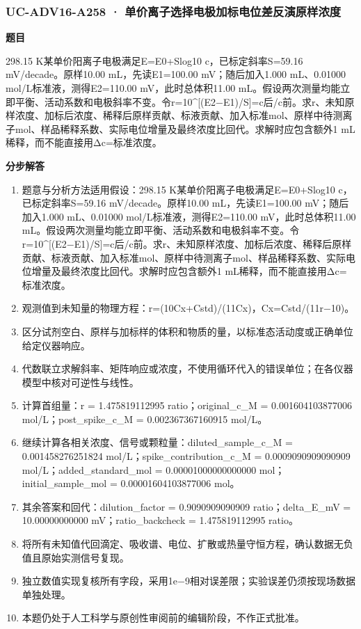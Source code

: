 \documentclass[UTF8,11pt,a4paper]{ctexart}
\begin{document}
\subsubsection*{UC-ADV16-A258 · 单价离子选择电极加标电位差反演原样浓度}
\noindent\textbf{题目}\par
298.15 K某单价阳离子电极满足E=E0+Slog10 c，已标定斜率S=59.16 mV/decade。原样10.00 mL，先读E1=100.00 mV；随后加入1.000 mL、0.01000 mol/L标准液，测得E2=110.00 mV，此时总体积11.00 mL。假设两次测量均能立即平衡、活动系数和电极斜率不变。令r=10\textasciicircum{}[(E2−E1)/S]=c后/c前。求r、未知原样浓度、加标后浓度、稀释后原样贡献、标液贡献、加入标准mol、原样中待测离子mol、样品稀释系数、实际电位增量及最终浓度比回代。求解时应包含额外1 mL稀释，而不能直接用Δc=标准浓度。\par
\medskip\noindent\textbf{分步解答}
\begin{enumerate}
\item 题意与分析方法适用假设：298.15 K某单价阳离子电极满足E=E0+Slog10 c，已标定斜率S=59.16 mV/decade。原样10.00 mL，先读E1=100.00 mV；随后加入1.000 mL、0.01000 mol/L标准液，测得E2=110.00 mV，此时总体积11.00 mL。假设两次测量均能立即平衡、活动系数和电极斜率不变。令r=10\textasciicircum{}[(E2−E1)/S]=c后/c前。求r、未知原样浓度、加标后浓度、稀释后原样贡献、标液贡献、加入标准mol、原样中待测离子mol、样品稀释系数、实际电位增量及最终浓度比回代。求解时应包含额外1 mL稀释，而不能直接用Δc=标准浓度。
\item 观测值到未知量的物理方程：r=(10Cx+Cstd)/(11Cx)，Cx=Cstd/(11r−10)。
\item 区分试剂空白、原样与加标样的体积和物质的量，以标准态活动度或正确单位给定仪器响应。
\item 代数联立求解斜率、矩阵响应或浓度，不使用循环代入的错误单位；在各仪器模型中核对可逆性与线性。
\item 计算首组量：r = 1.475819112995 ratio；original\_c\_M = 0.001604103877006 mol/L；post\_spike\_c\_M = 0.002367367160915 mol/L。
\item 继续计算各相关浓度、信号或颗粒量：diluted\_sample\_c\_M = 0.001458276251824 mol/L；spike\_contribution\_c\_M = 0.0009090909090909 mol/L；added\_standard\_mol = 0.00001000000000000 mol；initial\_sample\_mol = 0.00001604103877006 mol。
\item 其余答案和回代：dilution\_factor = 0.9090909090909 ratio；delta\_E\_mV = 10.00000000000 mV；ratio\_backcheck = 1.475819112995 ratio。
\item 将所有未知值代回滴定、吸收谱、电位、扩散或热量守恒方程，确认数据无负值且原始实测信号复现。
\item 独立数值实现复核所有字段，采用1e−9相对误差限；实验误差仍须按现场数据单独处理。
\item 本题仍处于人工科学与原创性审阅前的编辑阶段，不作正式批准。
\end{enumerate}
\end{document}
